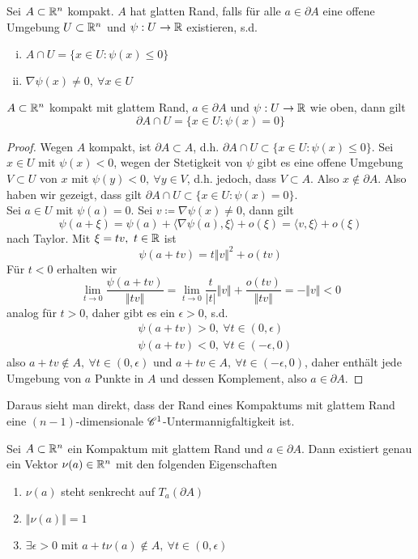 \begin{defn}
    Sei $A\subset \mathbb{R}^n$ kompakt. $A$ hat glatten Rand, falls für alle $a\in \partial A$ eine offene Umgebung
    $U\subset \mathbb{R}^n$ und $\psi:U\to \mathbb{R}$ existieren, s.d. 
    \begin{enumerate}[(i)]
        \item $A\cap U = \{ x\in U : \psi(x)\le 0\}$
        \item $\nabla \psi(x)\neq 0,\ \forall x\in U$
    \end{enumerate}
\end{defn}
\begin{lemma}
    $A\subset \mathbb{R}^n$ kompakt mit glattem Rand, $a\in \partial A$ und $\psi:U\to \mathbb{R}$ wie oben, dann gilt
    \[
    \partial A \cap U = \{ x\in U : \psi(x)=0\}    
    \]
\end{lemma}
\begin{proof}
    Wegen $A$ kompakt, ist $\partial A\subset A$, d.h. $\partial A \cap U \subset \{ x\in U : \psi(x)\le 0\}$. 
    Sei $x\in U$ mit $\psi(x)<0$, wegen der Stetigkeit von $\psi$ gibt es eine offene Umgebung $V\subset U$ von $x$ mit $\psi(y)<0,\ \forall y\in V$, d.h. jedoch, dass $V\subset A$. Also $x\notin \partial A$. Also haben wir gezeigt, dass gilt $\partial A \cap U \subset \{x\in U : \psi(x)=0\}$.
    \\ Sei $a\in U$ mit $\psi(a)=0$. Sei $v\coloneqq \nabla \psi(x)\neq 0$, dann gilt 
    \[
    \psi(a+\xi) = \psi(a)+ \langle \nabla \psi(a),\xi \rangle + o(\xi) = \langle v,\xi \rangle + o(\xi)    
    \] 
    nach Taylor. Mit $\xi = tv, \ t\in \mathbb{R}$ ist 
    \[
    \psi(a+tv) = t \Vert v\Vert^2 + o(tv)    
    \]
    Für $t<0$ erhalten wir 
    \[
    \lim_{t\to 0} \frac{\psi(a+tv)}{\Vert tv\Vert} = \lim_{t\to 0} \frac{t}{\vert t\vert}\Vert v\Vert + \frac{o(tv)}{\Vert tv\Vert} = -\Vert v\Vert <0     
    \]
    analog für $t>0$, daher gibt es ein $\epsilon >0$, s.d. 
    \begin{align*}
        &\psi(a+tv) > 0, \ \forall t\in(0,\epsilon)\\
        & \psi(a+tv) < 0, \ \forall t\in (-\epsilon,0) 
    \end{align*}
    also $a+tv\notin A, \ \forall t\in (0,\epsilon)$ und $a+tv\in A, \ \forall t\in (-\epsilon,0)$, daher enthält jede Umgebung von $a$ Punkte in $A$ und dessen Komplement, also $a\in \partial A$. 
\end{proof}
Daraus sieht man direkt, dass der Rand eines Kompaktums mit glattem Rand eine $(n-1)$-dimensionale $\mathscr{C}^1$-Untermannigfaltigkeit ist. 
\begin{satz}
    Sei $A\subset \mathbb{R}^n$ ein Kompaktum mit glattem Rand und $a\in \partial A$. Dann existiert genau ein Vektor $\nu(a)\in \mathbb{R}^n$ mit den folgenden Eigenschaften
    \begin{enumerate}[(1)]
        \item $\nu(a)$ steht senkrecht auf $T_a(\partial A)$
        \item $\Vert \nu(a)\Vert =1$
        \item $\exists \epsilon >0$ mit 
            $a + t\nu(a)\notin A, \ \forall t\in (0,\epsilon) $
    \end{enumerate}
\end{satz}
